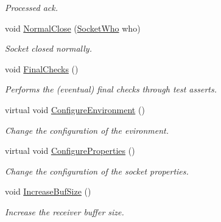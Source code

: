 \begin{DoxyCompactItemize}
\begin{DoxyCompactList}\small\item\em Processed ack. \end{DoxyCompactList}\item 
void \hyperlink{classTcpZeroWindowTest_ad90cb2d4119c58675d439c5420d67e1a}{Normal\+Close} (\hyperlink{classns3_1_1TcpGeneralTest_a29338e6b7137cad650c2ff835713f6ee}{Socket\+Who} who)
\begin{DoxyCompactList}\small\item\em Socket closed normally. \end{DoxyCompactList}\item 
void \hyperlink{classTcpZeroWindowTest_a14cb644621314ffd24ceef333b6abe13}{Final\+Checks} ()
\begin{DoxyCompactList}\small\item\em Performs the (eventual) final checks through test asserts. \end{DoxyCompactList}\item 
virtual void \hyperlink{classTcpZeroWindowTest_ac5468dca75edd6211d8edb9e5104b405}{Configure\+Environment} ()
\begin{DoxyCompactList}\small\item\em Change the configuration of the evironment. \end{DoxyCompactList}\item 
virtual void \hyperlink{classTcpZeroWindowTest_a479fded52c00397a0262d7584d00fec9}{Configure\+Properties} ()
\begin{DoxyCompactList}\small\item\em Change the configuration of the socket properties. \end{DoxyCompactList}\item 
void \hyperlink{classTcpZeroWindowTest_a7e9e165eee9f680e1b0071ffc64a87af}{Increase\+Buf\+Size} ()
\begin{DoxyCompactList}\small\item\em Increase the receiver buffer size. \end{DoxyCompactList}\end{DoxyCompactItemize}
